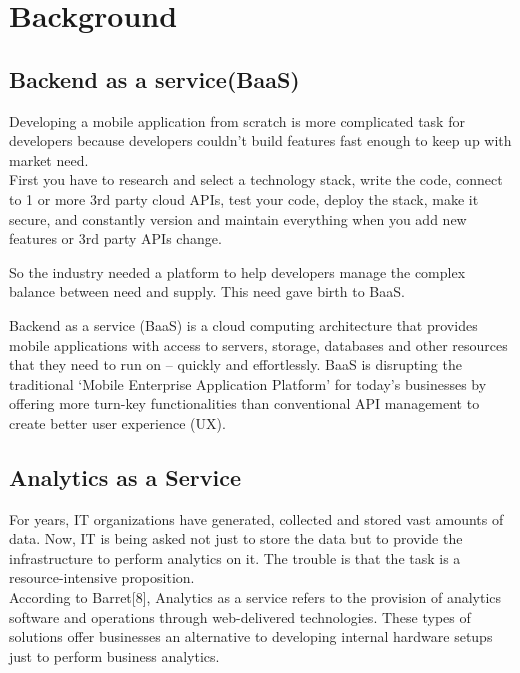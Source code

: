 \documentclass[a4paper,12pt]{report}
\begin{document}
    
    
    \chapter {Background}            
    \section{Backend as a service(BaaS)}    
    Developing a mobile application from scratch is more complicated task for developers because developers couldn’t build features fast enough to keep up with market need. \\
    First you have to research and select a technology stack, write the code, connect to 1 or more 3rd party cloud APIs, test your code, deploy the stack, make it secure, and constantly version and maintain everything when you add new features or 3rd party APIs change. \par
    So the industry needed a platform to help developers manage the complex balance between need and supply. This need gave birth to BaaS. 
    \par Backend as a service (BaaS) is a cloud computing architecture that provides mobile applications with access to servers, storage, databases and other resources that they need to run on – quickly and effortlessly. BaaS is disrupting the traditional ‘Mobile Enterprise Application Platform’ for today’s businesses by offering more turn-key functionalities than conventional API management to create better user experience (UX). 
    \section{Analytics as a Service}    
    For years, IT organizations have generated, collected and stored vast amounts of data. Now, IT is being asked not just to store the data but to provide the infrastructure to perform analytics on it. The trouble is that the task is a resource-intensive proposition. \\    
    According to Barret[8], Analytics as a service refers to the provision of analytics software and operations through web-delivered technologies. These types of solutions offer businesses an alternative to developing internal hardware setups just to perform business analytics.
\end{document}

